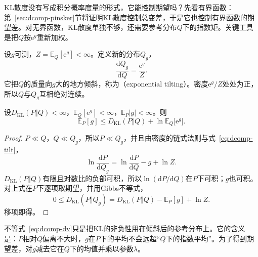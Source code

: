KL散度没有写成积分概率度量的形式，它能控制期望吗？先看有界函数：第~\ref{sec:dcomp-pinsker}节将证明KL散度控制总变差，于是它也控制有界函数的期望差。对无界函数，KL散度单独不够，还需要参考分布$Q$下的指数矩。关键工具是把$Q$按$\mathrm{e}^{g}$重新加权。

设$g$可测，$Z=\mathbb{E}_{Q}[\mathrm{e}^{g}]<\infty$。定义新的分布$Q_g$，
\begin{equation}
 \frac{\mathrm{d}Q_g}{\mathrm{d}Q}=\frac{\mathrm{e}^{g}}{Z} .
 \label{eq:dcomp-tilt}
\end{equation}
它把$Q$的质量向$g$大的地方倾斜，称为（exponential tilting）。密度$\mathrm{e}^{g}/Z$处处为正，所以$Q$与$Q_g$互相绝对连续。

\begin{lemma}[KL与对数矩母函数]
\label{lem:dcomp-dv}
设$D_{\mathrm{KL}}(P\Vert Q)<\infty$，$\mathbb{E}_{Q}[\mathrm{e}^{g}]<\infty$，$\mathbb{E}_{P}\lvert g\rvert<\infty$。则
\begin{equation}
 \mathbb{E}_{P}[g]\leq D_{\mathrm{KL}}(P\Vert Q)+\ln\mathbb{E}_{Q}\bigl[\mathrm{e}^{g}\bigr] .
 \label{eq:dcomp-dv}
\end{equation}
\end{lemma}

\begin{proof}
$P\ll Q$，$Q\ll Q_g$，所以$P\ll Q_g$，并且由密度的链式法则与式~\eqref{eq:dcomp-tilt}，
\[
 \ln\frac{\mathrm{d}P}{\mathrm{d}Q_g}=\ln\frac{\mathrm{d}P}{\mathrm{d}Q}-g+\ln Z .
\]
$D_{\mathrm{KL}}(P\Vert Q)$有限且对数比的负部可积，所以$\ln(\mathrm{d}P/\mathrm{d}Q)$在$P$下可积；$g$也可积。对上式在$P$下逐项取期望，并用Gibbs不等式，
\[
 0\leq D_{\mathrm{KL}}(P\Vert Q_g)=D_{\mathrm{KL}}(P\Vert Q)-\mathbb{E}_{P}[g]+\ln Z .
\]
移项即得。
\end{proof}

不等式~\eqref{eq:dcomp-dv}只是把KL的非负性用在倾斜后的参考分布上。它的含义是：$P$相对$Q$偏离不大时，$g$在$P$下的平均不会远超“$Q$下的指数平均”。为了得到期望差，对$g$减去它在$Q$下的均值并乘以参数$\lambda$。

